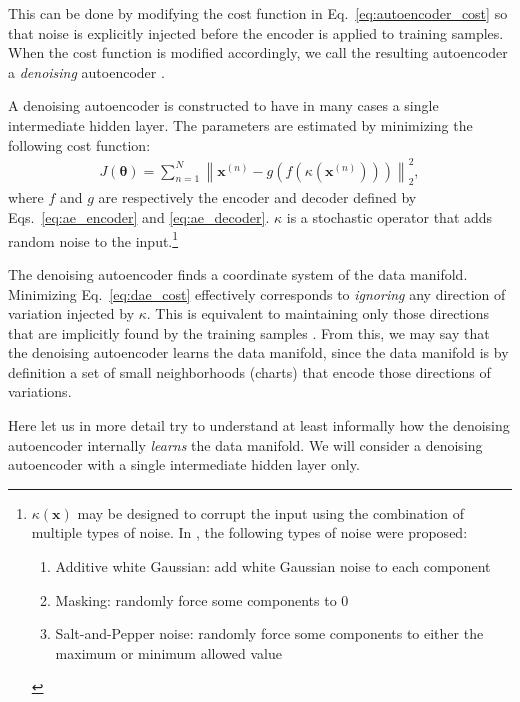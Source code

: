 \documentclass{now}
\newcommand{\vect}[1]{\mathbf{#1}}
\newcommand{\vects}[1]{\boldsymbol{#1}}
\newcommand{\vx}[0]{\vect{x}}
\newcommand{\TT}[0]{{\vects{\theta}}}
\begin{document}
This can be done 
by modifying the cost
function in Eq.~\eqref{eq:autoencoder_cost} so that noise is
explicitly injected before the encoder is applied to
training samples.  When the cost function is modified
accordingly, we call the resulting autoencoder a
\textit{denoising} autoencoder \citep{Vincent2010}. 

A denoising autoencoder is constructed to have in many
cases a single intermediate hidden layer. The parameters
are estimated by minimizing the following cost function:
\begin{align}
    \label{eq:dae_cost}
    J(\TT) =  \sum_{n=1}^N \left\| \vx^{(n)} -
    g\left(f(\kappa(\vx^{(n)}))\right)
    \right\|_2^2,
\end{align}
where $f$ and $g$ are respectively the encoder and decoder
defined by Eqs.~\eqref{eq:ae_encoder} and
\eqref{eq:ae_decoder}.  $\kappa$ is a stochastic operator
that adds 
random noise to the input.\footnote{
$\kappa(\vx)$ may be designed to corrupt the input using the
combination of multiple types of noise. In
\citep{Vincent2010}, the following types of noise were
proposed:
\begin{enumerate}
        \vspace{-5mm}
    \itemsep 0em
    \item Additive white Gaussian: add white Gaussian noise
        to each component
    \item Masking: randomly force some components to $0$
    \item Salt-and-Pepper noise: randomly force some
        components to either the maximum or minimum allowed
        value
\end{enumerate}
}

The denoising autoencoder finds a coordinate system of the
data manifold.
Minimizing Eq.~\eqref{eq:dae_cost} effectively corresponds
to \textit{ignoring} any direction of variation injected by
$\kappa$. This is equivalent to maintaining only those
directions that are implicitly found by the training samples
\citep{Vincent2010}. From this, we may say that the
denoising autoencoder learns the data manifold, since the
data manifold is by definition a set of small
neighborhoods (charts) that encode those directions of
variations.

Here let us in more detail try to understand at least
informally how the denoising autoencoder internally
\textit{learns} the data manifold. We will consider a
denoising autoencoder with a single intermediate hidden
layer only.
\end{document}
